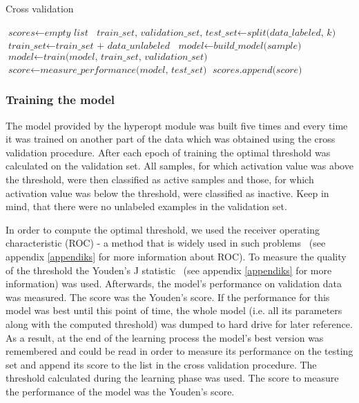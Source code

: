 \documentclass[a4paper,10pt]{report}
\begin{document}
	\begin{algorithm}
	\caption{Cross validation}\label{alg:cross_validation}
	\begin{algorithmic}[1]
	\State
	\State $\textit{scores} \gets \textit{empty list}$
	\State
	  \State $\textit{train\_set, validation\_set, test\_set} \gets \textit{split(data\_labeled, k)} $
	  \State $\textit{train\_set} \gets \textit{train\_set + data\_unlabeled}$
	  \State $\textit{model} \gets \textit{build\_model(sample)}$
	  \State $\textit{model} \gets \textit{train(model, train\_set, validation\_set)}$
	  \State $\textit{score} \gets \textit{measure\_performance(model, test\_set)}$
	  \State $\textit{scores.append(score)}$
	\EndFor
	\State       
	\State
	\EndProcedure
	\end{algorithmic}
	\end{algorithm}
	
	\subsubsection{Training the model}
	The model provided by the hyperopt module was built five times and every time it was trained on another part of the data which was obtained using the cross validation procedure. After each epoch of training the optimal threshold was calculated on the validation set. All samples, for which activation value was above the threshold, were then classified as active samples and those, for which activation value was below the threshold, were classified as inactive. Keep in mind, that there were no unlabeled examples in the validation set.
	
	In order to compute the optimal threshold, we used the receiver operating characteristic (ROC) - a method that is widely used in such problems~\cite{ROC_1, ROC_EF} (see appendix \ref{appendiks} for more information about ROC). To measure the quality of the threshold the Youden's J statistic~\cite{YOUDEN} (see appendix \ref{appendiks} for more information) was used. Afterwards, the model's performance on validation data was measured. The score was the Youden's score. If the performance for this model was best until this point of time, the whole model (i.e. all its parameters along with the computed threshold) was dumped to hard drive for later reference. As a result, at the end of the learning process the model's best version was remembered and could be read in order to measure its performance on the testing set and append its score to the list in the cross validation procedure. The threshold calculated during the learning phase was used. The score to measure the performance of the model was the Youden's score. 
	
\end{document}
